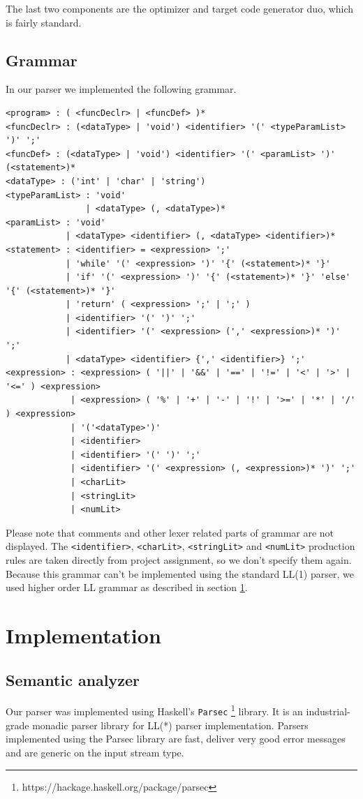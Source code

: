 \documentclass[titlepage]{article}
\begin{document}
The last two components are the optimizer and target code generator duo, which is fairly 
standard.

\subsection{Grammar}
In our parser we implemented the following grammar.

\begin{verbatim}
<program> : ( <funcDeclr> | <funcDef> )*
<funcDeclr> : (<dataType> | 'void') <identifier> '(' <typeParamList> ')' ';'
<funcDef> : (<dataType> | 'void') <identifier> '(' <paramList> ')' (<statement>)*
<dataType> : ('int' | 'char' | 'string')
<typeParamList> : 'void'
                | <dataType> (, <dataType>)*			  
<paramList> : 'void'
            | <dataType> <identifier> (, <dataType> <identifier>)*		  
<statement> : <identifier> = <expression> ';'
            | 'while' '(' <expression> ')' '{' (<statement>)* '}'
            | 'if' '(' <expression> ')' '{' (<statement>)* '}' 'else' '{' (<statement>)* '}'
            | 'return' ( <expression> ';' | ';' )
            | <identifier> '(' ')' ';'
            | <identifier> '(' <expression> (',' <expression>)* ')' ';'
            | <dataType> <identifier> {',' <identifier>} ';'       
<expression> : <expression> ( '||' | '&&' | '==' | '!=' | '<' | '>' | '<=' ) <expression>
             | <expression> ( '%' | '+' | '-' | '!' | '>=' | '*' | '/' ) <expression>
             | '('<dataType>')'
             | <identifier>
             | <identifier> '(' ')' ';'
             | <identifier> '(' <expression> (, <expression>)* ')' ';'
             | <charLit>
             | <stringLit>
             | <numLit>          
\end{verbatim}

Please note that comments and other lexer related parts of grammar are not displayed.
The \texttt{<identifier>}, \texttt{<charLit>}, \texttt{<stringLit>} and \texttt{<numLit>}
production rules are taken directly from project assignment, so we don't specify them
again. Because this grammar can't be implemented using the standard LL(1) parser, we
used higher order LL grammar as described in section \ref{sec:implementation}. 

\section{Implementation}
\label{sec:implementation}

\subsection{Semantic analyzer}
Our parser was implemented using Haskell's \texttt{Parsec} 
\footnote{https://hackage.haskell.org/package/parsec} library. It is
an industrial-grade monadic parser library for LL(*) parser implementation. Parsers 
implemented using the Parsec library are fast, deliver very good error messages and
are generic on the input stream type.
\end{document}
